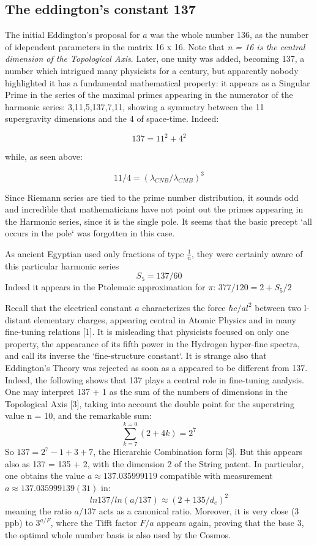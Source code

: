\documentclass[twoside,draft]{article}
\begin{document}
\begin{sloppypar}
{\subsection{The eddington's constant 137}

The initial Eddington's proposal for $a$ was the whole number 136, as the number of idependent parameters in the matrix 16 x 16. Note that \textit{n = 16 is the central dimension of the Topological Axis}. Later, one unity was added, becoming 137, a number which intrigued many physicists for a century, but apparently nobody highlighted it has a fundamental mathematical property: it appears as a Singular Prime in the series of the maximal primes appearing in the numerator of the harmonic
series: 3,11,5,137,7,11, showing a symmetry between the 11 supergravity dimensions and the 4 of
space-time. Indeed:

$$137 = 11^{2} + 4^{2}$$

while, as seen above:

$$11/4 = (\lambda_{CNB}/\lambda_{CMB})^{3}$$

Since Riemann series are tied to the prime number distribution, it sounds odd and incredible that mathematicians
have not point out the primes appearing in the Harmonic series, since it is the single pole. It seems
that the basic precept `all occurs in the pole` was forgotten in this case. 

As ancient Egyptian used only fractions of type $\frac{1}{n}$, they were certainly aware of this particular harmonic series 
$$S_{5} = 137/60$$
Indeed it appears in the Ptolemaic approximation for $\pi$: $377/120 = 2 +  S_{5}/2$

Recall that the electrical constant $a$ characterizes the force $\hbar c/al^{2}$ between two l-distant
elementary charges, appearing central in Atomic Physics and in many fine-tuning relations [1]. It is
misleading that physicists focused on only one property, the appearance of its fifth power in the
Hydrogen hyper-fine spectra, and call its inverse the `fine-structure constant`. It is strange also that
Eddington's Theory was rejected as soon as a appeared to be different from 137. Indeed, the
following shows that 137 plays a central role in fine-tuning analysis. One may interpret 137 + 1 as
the sum of the numbers of dimensions in the Topological Axis [3], taking into account the double
point for the superstring value n = 10, and the remarkable sum:
\begin{equation}
\sum_{k=7}^{k=0}(2 + 4 k ) = 2^{7}
\end{equation}
So $137 = 2^{7} - 1 + 3 + 7$, the Hierarchic Combination form [3]. But this appears also as 137 = 135 + 2,
with the dimension 2 of the String patent. In particular, one obtains the value $a \approx 137.035999119$
compatible with measurement $a \approx 137.035999139(31)$ in:
\begin{equation}
ln137/ln(a/137) \approx (2+135/d_{e})^{2}
\end{equation}
meaning the ratio $a/137$ acts as a canonical ratio. Moreover, it is very close (3 ppb) to $3^{a/F}$, where the Tifft factor $F/a$ appears again, proving that the base 3, the optimal whole number basis is also used by the Cosmos.

}
\end{sloppypar}
\end{document}
